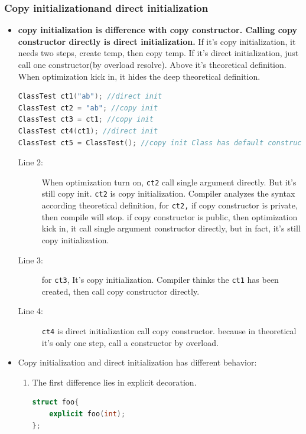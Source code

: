 \documentclass[a4paper,11pt,twoside]{book}
\begin{document}
\subsubsection{Copy initializationand direct initialization}
\begin{itemize}

	\item \textbf{copy initialization is difference with copy constructor. Calling copy constructor directly is direct initialization.} If it's copy initialization, it needs two steps, create temp, then copy temp.  If it's direct initialization, just call one constructor(by overload resolve). Above it's theoretical definition. When optimization kick in, it hides the deep theoretical definition.
	
\begin{lstlisting}[frame=single, language=c++]
ClassTest ct1("ab"); //direct init
ClassTest ct2 = "ab"; //copy init 
ClassTest ct3 = ct1; //copy init
ClassTest ct4(ct1); //direct init
ClassTest ct5 = ClassTest(); //copy init Class has default constructor
\end{lstlisting}
\begin{description}
	\item[Line 2:]  When optimization turn on, \texttt{ct2} call single argument directly. But it's still copy init. \texttt{ct2} is copy initialization. Compiler analyzes the syntax according theoretical definition, for \texttt{ct2,} if copy constructor is private, then compile will stop. if copy constructor is public, then optimization kick in, it call single argument constructor directly, but in fact, it's still copy initialization.
	
	\item[Line 3:] for \texttt{ct3}, It's copy initialization. Compiler thinks the \texttt{ct1} has been created, then call copy constructor directly. 
	
	\item[Line 4:] \texttt{ct4} is direct initialization call copy constructor. because in theoretical it's only one step, call a constructor by overload. 
	
\end{description}

	\item Copy initialization and direct initialization has different behavior:
	\begin{enumerate}
		\item The first difference lies in explicit decoration.
\begin{lstlisting}[frame=single, language=c++]
struct foo{
	explicit foo(int);
};


\end{lstlisting}
\end{enumerate}
\end{itemize}
\end{document}
